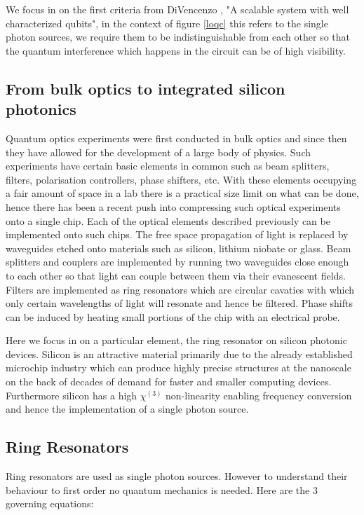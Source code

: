 We focus in on the first criteria from DiVencenzo \cite{divincenzo_physical_2000}, "A scalable system with well characterized qubits", in the context of figure \ref{loqc} this refers to the single photon sources, we require them to be indistinguishable from each other so that the quantum interference which happens in the circuit can be of high visibility. 



\subsection{From bulk optics to integrated silicon photonics}
Quantum optics experiments were first conducted in bulk optics \cite{burnham_observation_1970} and since then they have allowed for the development of a large body of physics. Such experiments have certain basic elements in common such as beam splitters, filters, polarisation controllers, phase shifters, etc. With these elements occupying a fair amount of space in a lab there is a practical size limit on what can be done, hence there has been a recent push into compressing such optical experiments onto a single chip. Each of the optical elements described previously can be implemented onto such chips. The free space propagation of light is replaced by waveguides etched onto materials such as silicon, lithium niobate or glass. Beam splitters and couplers are implemented by running two waveguides close enough to each other so that light can couple between them via their evanescent fields. Filters are implemented as ring resonators which are circular cavaties with which only certain wavelengths of light will resonate and hence be filtered. Phase shifts can be induced by heating small portions of the chip with an electrical probe.

Here we focus in on a particular element, the ring resonator on silicon photonic devices. Silicon is an attractive material primarily due to the already established microchip industry which can produce highly precise structures at the nanoscale on the back of decades of demand for faster and smaller computing devices. Furthermore silicon has a high $\chi^{(3)}$ non-linearity enabling frequency conversion and hence the implementation of a single photon source.

\subsection{Ring Resonators}
Ring resonators are used as single photon sources. However to understand their behaviour to first order no quantum mechanics is needed. Here are the 3 governing equations:

